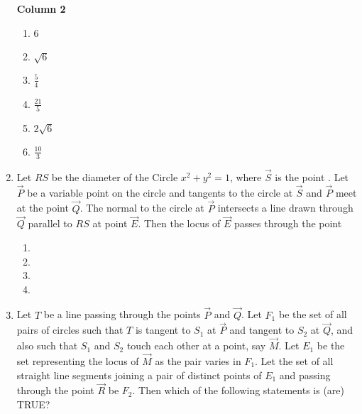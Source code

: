 \begin{enumerate}
\begin{multicols}{2}
\begin{multicols}{2}
\end{multicols}
\columnbreak
 \textbf{Column 2}
 \begin{multicols}{2}
\begin{enumerate}[label=(\alph*),  start=16]
 \item 6
 \item $\sqrt{6}$
 \item $\frac{5}{4}$                           
 \item $\frac{21}{5}$                          
 \item $2\sqrt{6}$                             
 \item $\frac{10}{3}$                         
 \end{enumerate}
\end{multicols}
\end{multicols}
%
\item Let $RS$ be the diameter of the Circle $x^{2} + y^{2} = 1$,  where $\vec{S}$ is the point . Let $\vec{P}$ be a variable point  on the circle and tangents to the circle at $\vec{S}$ and $\vec{P}$ meet at the point $\vec{Q}$. The normal to the circle at $\vec{P}$ intersects a line drawn through $\vec{Q}$ parallel to $RS$ at point $\vec{E}$. Then the locus of $\vec{E}$ passes through the point
%
\hfill {}
\begin{multicols}{4}
\begin{enumerate}
	\item {}
	\item {}
	\item {}
	\item {}
\end{enumerate}
\end{multicols}
\item Let $T$ be a line passing through the points $\vec{P}$ and $\vec{Q}$. Let $F_1$ be the set of all pairs of circles  such that $T$ is tangent to $S_1$ at $\vec{P}$ and tangent to $S_2$ at $\vec{Q}$,  and also such that $S_1$ and $S_2$ touch each other at a point,  say $\vec{M}$. Let $E_1$ be the set representing the locus of $\vec{M}$ as the pair  varies in $F_1$. Let the set of all straight line segments joining a pair of distinct points of $E_1$ and passing through the point $\vec{R}$ be $F_2$. Then which of the following statements is (are) TRUE?

\end{enumerate}
